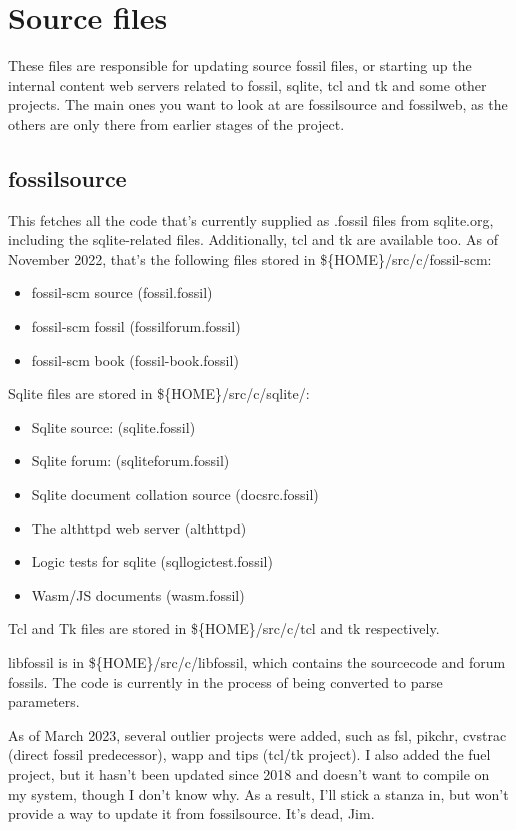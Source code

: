 \documentclass[11pt]{article}
\begin{document}
\section*{Source files}
\label{sec:orgfc8574d}

These files are responsible for updating source fossil files, or starting up the internal content
web servers related to fossil, sqlite, tcl and tk and some other projects. The main ones you want to
look at are fossilsource and fossilweb, as the others are only there from earlier stages of the
project.


\subsection*{fossilsource}
\label{sec:org4031d62}
This fetches all the code that's currently supplied as .fossil files from sqlite.org, including the
sqlite-related files. Additionally, tcl and tk are available too. As of November 2022, that's the
following files stored in \$\{HOME\}/src/c/fossil-scm:
\begin{itemize}
\item fossil-scm source (fossil.fossil)
\item fossil-scm fossil (fossilforum.fossil)
\item fossil-scm book (fossil-book.fossil)
\end{itemize}

Sqlite files are stored in \$\{HOME\}/src/c/sqlite/:
\begin{itemize}
\item Sqlite source: (sqlite.fossil)
\item Sqlite forum: (sqliteforum.fossil)
\item Sqlite document collation source (docsrc.fossil)
\item The althttpd web server (althttpd)
\item Logic tests for sqlite (sqllogictest.fossil)
\item Wasm/JS documents (wasm.fossil)
\end{itemize}

Tcl and Tk files are stored in \$\{HOME\}/src/c/tcl and tk respectively.

libfossil is in \$\{HOME\}/src/c/libfossil, which contains the sourcecode and forum fossils.  The code
is currently in the process of being converted to parse parameters.

As of March 2023, several outlier projects were added, such as fsl, pikchr, cvstrac (direct fossil
predecessor), wapp and tips (tcl/tk project). I also added the fuel project, but it hasn't been
updated since 2018 and doesn't want to compile on my system, though I don't know why. As a result,
I'll stick a stanza in, but won't provide a way to update it from fossilsource. It's dead, Jim.
\end{document}
